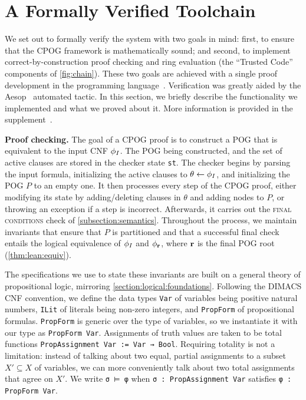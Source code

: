 \section{A Formally Verified Toolchain}
\label{section:formally-verified-toolchain}

We set out to formally verify the system with two goals in mind: first, to ensure that the CPOG framework is mathematically
sound; and second, to implement correct-by-construction proof checking and ring evaluation (the ``Trusted Code'' components of \cref{fig:chain}). These two goals are achieved with a single proof development in the \lean{} programming language~\cite{demoura:cade:2021}. Verification was greatly aided by the Aesop~\cite{23limperg_aesop_white_box_best_first_proof_search_lean} automated tactic. In this section, we briefly describe the functionality we implemented and what we proved about it. More information is provided in the supplement~\cite{bryant:sat:2023:supplement}.

\vspace{1em}\noindent
\textbf{Proof checking.} The goal of a CPOG proof is to construct a POG that is equivalent to the input CNF $\phi_I$. The POG being constructed, and the set of active clauses are stored in the checker state \texttt{st}. The checker begins by parsing the input formula, initializing the active clauses to $\theta \leftarrow \phi_I$, and initializing the POG $P$ to an empty one. It then processes every step of the CPOG proof, either modifying its state by adding/deleting clauses in $\theta$ and adding nodes to $P$, or throwing an exception if a step is incorrect. Afterwards, it carries out the \textsc{final conditions} check of \cref{subsection:semantics}. Throughout the process, we maintain invariants that ensure that $P$ is partitioned and that a successful final check entails the logical equivalence of $\phi_I$ and $\phi_{\mathbf{r}}$, where $\mathbf{r}$ is the final POG root (\cref{thm:lean:equiv}).

The specifications we use to state these invariants are built on a general theory of propositional logic, mirroring \cref{section:logical:foundations}. Following the DIMACS CNF convention, we define the data types \lstinline{Var} of variables being positive natural numbers, \lstinline{ILit} of literals being non-zero integers, and \lstinline{PropForm} of propositional formulas. \lstinline{PropForm} is generic over the type of variables, so we instantiate it with our type as \lstinline{PropForm Var}. Assignments of truth values are taken to be total functions \lstinline{PropAssignment Var := Var → Bool}. Requiring totality is not a limitation: instead of talking about two equal, partial assignments to a subset $X' \subseteq X$ of variables, we can more conveniently talk about two total assignments that agree on $X'$. We write \lstinline{σ ⊨ φ} when \lstinline{σ : PropAssignment Var} satisfies \lstinline{φ : PropForm Var}.


